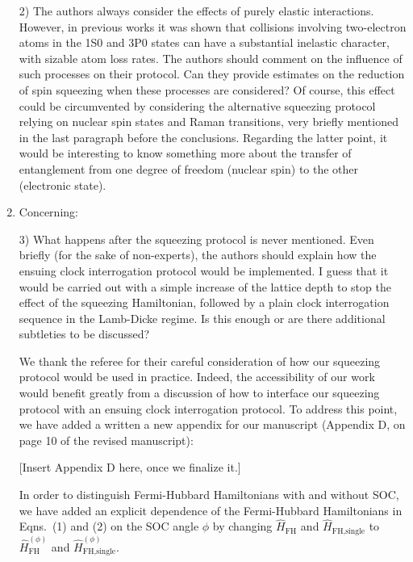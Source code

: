 \documentclass[reprint,onecolumn,12pt]{revtex4-2}
\renewcommand{\t}{\text} %
\newcommand{\blue}[1]{{\color{blue} #1}}
\newcommand{\red}[1]{{\color{red} #1}}
\newcommand{\green}[1]{{\color{ForestGreen} #1}}
\begin{document}
\begin{enumerate}
  \blue{2) The authors always consider the effects of purely elastic
    interactions. However, in previous works it was shown that
    collisions involving two-electron atoms in the 1S0 and 3P0 states
    can have a substantial inelastic character, with sizable atom loss
    rates. The authors should comment on the influence of such
    processes on their protocol. Can they provide estimates on the
    reduction of spin squeezing when these processes are considered?
    Of course, this effect could be circumvented by considering the
    alternative squeezing protocol relying on nuclear spin states and
    Raman transitions, very briefly mentioned in the last paragraph
    before the conclusions.  Regarding the latter point, it would be
    interesting to know something more about the transfer of
    entanglement from one degree of freedom (nuclear spin) to the
    other (electronic state).}



\item Concerning:

  \blue{3) What happens after the squeezing protocol is never
    mentioned. Even briefly (for the sake of non-experts), the authors
    should explain how the ensuing clock interrogation protocol would
    be implemented. I guess that it would be carried out with a simple
    increase of the lattice depth to stop the effect of the squeezing
    Hamiltonian, followed by a plain clock interrogation sequence in
    the Lamb-Dicke regime. Is this enough or are there additional
    subtleties to be discussed?}

  We thank the referee for their careful consideration of how our
  squeezing protocol would be used in practice.  Indeed, the
  accessibility of our work would benefit greatly from a discussion of
  how to interface our squeezing protocol with an ensuing clock
  interrogation protocol.  To address this point, we have added a
  written a new appendix for our manuscript (Appendix D, on page 10 of
  the revised manuscript):

  \green{[Insert Appendix D here, once we finalize it.]}

  In order to distinguish Fermi-Hubbard Hamiltonians with and without
  SOC, we have added an explicit dependence of the Fermi-Hubbard
  Hamiltonians in Eqns.~(1) and (2) on the SOC angle $\phi$ by
  changing \red{$\hat H_{\t{FH}}$} and \red{$\hat H_{\t{FH,single}}$}
  to \green{$\hat H_{\t{FH}}^{(\phi)}$} and
  \green{$\hat H_{\t{FH,single}}^{(\phi)}$}.


\end{enumerate}
\end{document}
